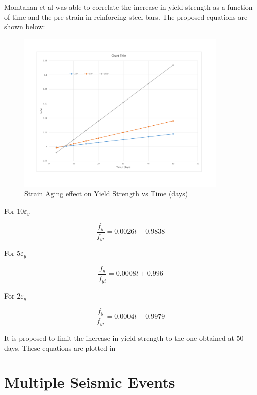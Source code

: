 Momtahan et al was able to correlate the increase in yield strength as a function of time and the pre-strain in reinforcing steel bars. The proposed equations are shown below:

\begin{figure}[htbp]
\centering
\includegraphics[width=0.9\textwidth]{Chapter-4/figs/StrainAging_TimeDependent}
\caption{Strain Aging effect on Yield Strength vs Time (days)}
\label{fig:hist4}
\end{figure}


For $10\varepsilon_y$

\begin{equation}
  \frac{f_y}{f_{yi}}=0.0026t+0.9838
  \label{eq.twelve}
\end{equation} 

For $5\varepsilon_y$

\begin{equation}
  \frac{f_y}{f_{yi}}=0.0008t+0.996
  \label{eq.thirteen}
\end{equation} 

For $2\varepsilon_y$

\begin{equation}
  \frac{f_y}{f_{yi}}=0.0004t+0.9979
  \label{eq.fourteen}
\end{equation} 

It is proposed to limit the increase in yield strength to the one obtained at 50 days. These equations are plotted in 


\section{Multiple Seismic Events}

